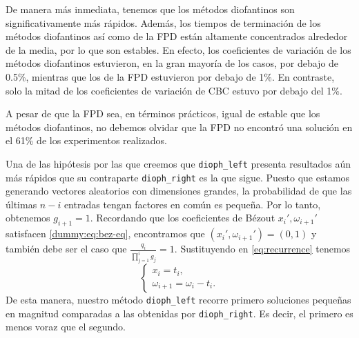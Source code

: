 De manera más inmediata, tenemos que los métodos diofantinos son significativamente más rápidos.
Además, los tiempos de terminación de los métodos diofantinos así como de la FPD están altamente
concentrados alrededor de la media, por lo que son estables. En efecto, los coeficientes de
variación de los métodos diofantinos estuvieron, en la gran mayoría de los casos, por debajo de
0.5\%, mientras que los de la FPD estuvieron por debajo de 1\%. En contraste, solo la mitad de los
coeficientes de variación de CBC estuvo por debajo del 1\%.

A pesar de que la FPD sea, en términos prácticos, igual de estable que los métodos diofantinos, no
debemos olvidar que la FPD no encontró una solución en el 61\% de los experimentos realizados.

Una de las hipótesis por las que creemos que \texttt{dioph\_left} presenta resultados aún más
rápidos que su contraparte \texttt{dioph\_right} es la que sigue. Puesto que estamos generando
vectores aleatorios con dimensiones grandes, la probabilidad de que las últimas $n - i$ entradas
tengan factores en común es pequeña. Por lo tanto, obtenemos $g_{i+1} = 1$. Recordando que los
coeficientes de Bézout $x_i', \omega_{i+1}'$ satisfacen \eqref{dummy:eq:bez-eq}, encontramos que
$(x_i', \omega_{i + 1}') = (0, 1)$ y también debe ser el caso que $\frac{q_i}{\prod_{j=1}^ig_j} =
1$. Sustituyendo en \eqref{eq:recurrence} tenemos
\begin{equation*}
	\begin{cases}
		x_i = t_i, \\
		\omega_{i + 1} = \omega_i - t_i.
	\end{cases}
\end{equation*}
De esta manera, nuestro método \texttt{dioph\_left} recorre primero soluciones pequeñas en magnitud
comparadas a las obtenidas por \texttt{dioph\_right}. Es decir, el primero es menos voraz que el
segundo.

